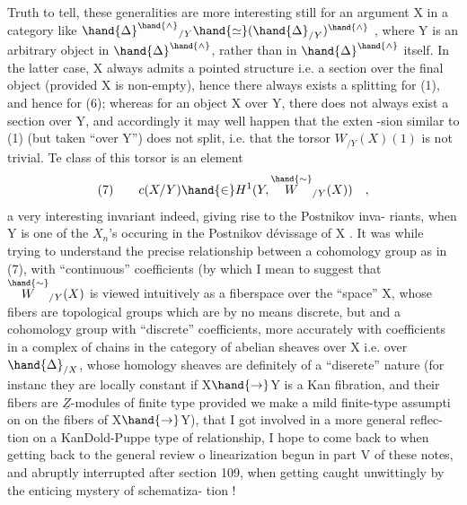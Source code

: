 
Truth to tell, these generalities are more interesting still  for
an argument X in a category like $\hand{\Delta}^{\hand{\wedge}}{}_{/Y} \hand{\simeq} (\hand{\Delta}_{/Y})^{\hand{\wedge}}$ , where Y is an arbitrary
object in $\hand{\Delta}^{\hand{\wedge}}$, rather than in $\hand{\Delta}^{\hand{\wedge}}$ itself. In the latter case, X always
admits a pointed structure i.e. a section over the final object (provided
X is non-empty), hence there always exists a splitting for (1), and
hence  for (6); whereas for an object X over Y, there does not always
exist a section over Y, and accordingly it may well happen that the exten%
-sion similar to (1) (but taken ``over Y'') does not split, i.e. that the
torsor $W_{/Y}(X)(1)$ is not trivial. Te class of this torsor is an element
\[ (7) \qquad c(X/Y)\hand{\in} H^1(Y, \overset{\hand{\sim}}{W}_{/Y}(X)) \quad , \]
a very interesting invariant indeed, giving rise to the Postnikov inva-%
riants, when Y is one of the $X_n$'s occuring in the Postnikov dévissage
of X . It was while trying to understand the precise relationship between
a cohomology group as in (7), with ``continuous'' coefficients (by which
I mean to suggest that $\overset{\hand{\sim}}{W}_{/Y}(X)$ is viewed intuitively as a fiberspace over
the ``space'' X, whose fibers are topological  groups which are by no means
discrete, but  and a cohomology group
with ``discrete'' coefficients, more accurately with coefficients in a
complex of chains in the category of abelian sheaves over X i.e. over $\hand{\Delta}_{/X}$,
whose homology sheaves are definitely of a ``diserete'' nature\xout{,} (for instanc%
they are locally constant if X$\hand{\to}$Y is a Kan fibration, and their fibers
are $\underline{Z}$-modules of finite type provided we make a mild finite-type assumpti%
on on the fibers of X$\hand{\to}$Y), that I got involved in a more general reflec-%
tion on a Kan\hand{-}Dold-Puppe type of relationship,  I hope to come back
to  when getting back to the general review o linearization begun in part
V of these notes, and abruptly interrupted after section 109, when
getting  caught unwittingly by the enticing mystery of schematiza-%
tion !

